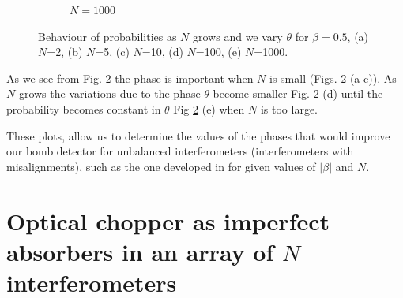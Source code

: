 \documentclass[12pt]{book}
\begin{document}
\begin{figure}[!t]
\begin{subfigure}[b]{0.30\linewidth}
\caption{$N=1000$ }
\label{1000}
\end{subfigure}
\caption{Behaviour of probabilities as $N$ grows and we vary $\theta$ for $\beta=0.5$, (a) $N$=2, (b) $N$=5, (c) $N$=10, (d) $N$=100, (e) $N$=1000.}
\label{con_fase}
\end{figure}

As we see from Fig. \ref{con_fase} the phase is important when $N$ is small (Figs. \ref{con_fase} (a-c)). As $N$  grows the variations due to the phase $\theta$ become smaller Fig. \ref{con_fase} (d) until the probability becomes constant in $\theta$ Fig \ref{con_fase} (e) when $N$ is too large.

These plots, allow us to determine the values of the phases that would improve our bomb detector for unbalanced interferometers (interferometers with misalignments), such as the one developed in \cite{Chao_2018} for given values of $|\beta|$ and $N$.

\section[Optical choppers case]{Optical chopper as imperfect absorbers in  an array of $N$ interferometers}
\end{document}
